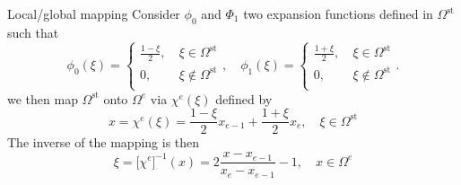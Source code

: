 \begin{frame}{Local/global mapping}
  Consider $\phi_0$ and $\Phi_1$ two expansion functions defined in $\Omega^{\text{st}}$ such that
  \begin{equation}
    \label{eq:42}
    \phi_0(\xi) =
    \begin{cases}
      \frac{1-\xi}{2}, \ & \xi \in \Omega^{\text{st}}\\
      0, & \xi \notin \Omega^{\text{st}}\\
    \end{cases},
    \quad
    \phi_1(\xi) =
    \begin{cases}
      \frac{1+\xi}{2}, \ & \xi \in \Omega^{\text{st}}\\
      0, & \xi \notin \Omega^{\text{st}}\\
    \end{cases}.
  \end{equation}
  we then map $\Omega^{\text{st}}$ onto $\Omega^e$ via $\chi^e(\xi)$ defined by 
  \begin{equation}
    \label{eq:43}
    x = \chi^e(\xi) = \frac{1-\xi}{2} x_{e-1} + \frac{1+\xi}{2} x_e, \quad \xi \in \Omega^{\text{st}}
  \end{equation}
  The inverse of the mapping is then
  \begin{equation}
    \label{eq:44}
    \xi = \Big[\chi^e\Big]^{-1}(x) = 2 \frac{x - x_{e-1}}{x_e-x_{e-1}} -1 , \quad x \in \Omega^{e}
  \end{equation}
\end{frame}
